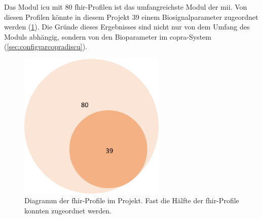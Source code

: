 Das Modul \glqq\ac{icu}\grqq{} mit 80 \ac{fhir}-Profilen ist das umfangreichste Modul der \ac{mii}. Von diesen Profilen könnte in diesem Projekt 39 einem Biosignalparameter zugeordnet werden (\ref{fig:profile}). Die Gründe dieses Ergebnisses sind nicht nur von dem Umfang des Moduls abhängig, sondern von den Bioparameter im \ac{copra}-System (\ref{sec:configvarcopradiscu}).

\clearpage

\begin{figure}[ht]
	\centering
	\includegraphics[height=7cm]{figures/profile}
	\caption[Diagramm der \acs{fhir}-Profile im Projekt]{Diagramm der \acs{fhir}-Profile im Projekt. Fast die Hälfte der \ac{fhir}-Profile konnten zugeordnet werden.}
	\label{fig:profile}
\end{figure}
